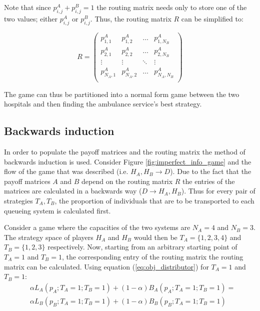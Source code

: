 Note that since \(p_{i,j}^A + p_{i,j}^B = 1\) the routing matrix needs only to
store one of the two values; either \(p_{i,j}^A\) or \(p_{i,j}^B\).
Thus, the routing matrix \(R\) can be simplified to:

\begin{equation}\label{eq:routing_matrix_simplified}
    R = 
    \begin{pmatrix}
        p_{1,1}^A & p_{1,2}^A & \dots & p_{1,N_B}^A \\
        p_{2,1}^A & p_{2,2}^A & \dots & p_{2,N_B}^A \\
        \vdots & \vdots & \ddots & \vdots \\
        p_{N_A,1}^A & p_{N_A,2}^A & \dots & p_{N_A,N_B}^A \\
    \end{pmatrix}
\end{equation}

The game can thus be partitioned into a normal form game between the
two hospitals and then finding the ambulance service's best strategy. 

\subsection{Backwards induction}

In order to populate the payoff matrices and the routing matrix the method
of backwards induction is used.
Consider Figure \ref{fig:imperfect_info_game} and the flow of the game that was
described (i.e. \(H_A, H_B \rightarrow D\)).
Due to the fact that the payoff matrices \(A\) and \(B\) depend on the routing 
matrix \(R\) the entries of the matrices are calculated in a backwards way 
(\(D \rightarrow H_A, H_B\)). 
Thus for every pair of strategies \(T_A, T_B\), the proportion of individuals 
that are to be transported to each queueing system is calculated first. 

Consider a game where the capacities of the two systems are \(N_A = 4\) and 
\(N_B = 3\).
The strategy space of players \(H_A\) and \(H_B\) would then be 
\(T_A = \{1, 2, 3, 4\}\) and \(T_B = \{1, 2, 3\}\) respectively.
Now, starting from an arbitrary starting point of \(T_A=1\) and \(T_B=1\), the
corresponding entry of the routing matrix the routing matrix can be calculated.
Using equation (\ref{eq:obj_distributor}) for \(T_A=1\) and \(T_B=1\):
\begin{align}
    & \alpha L_A(p_A;T_A=1;T_B=1) + (1 - \alpha) B_A(p_A;T_A=1;T_B=1) = 
    \nonumber \\
    & \alpha L_B(p_B;T_A=1;T_B=1) + (1 - \alpha) B_B(p_B;T_A=1;T_B=1) 
    \label{eq:obj_distributor_1_1}
\end{align}

